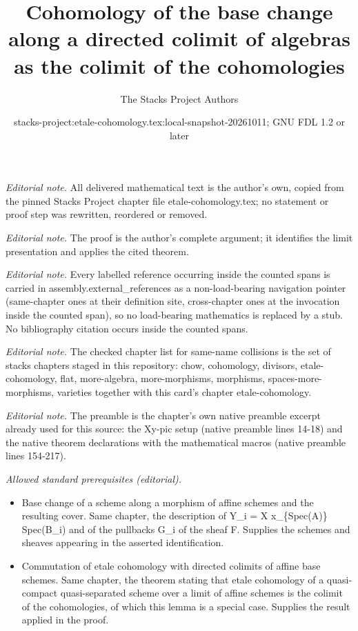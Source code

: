\documentclass[10pt,a4paper]{amsart}
\title{Cohomology of the base change along a directed colimit of algebras as the colimit of the cohomologies}
\author{The Stacks Project Authors}
\date{stacks-project:etale-cohomology.tex:local-snapshot-20261011; GNU FDL 1.2 or later}
\theoremstyle{plain}
\theoremstyle{definition}
\theoremstyle{remark}
\numberwithin{equation}{subsection}
\begin{document}
\maketitle
\noindent\textit{Editorial note.} All delivered mathematical text is the author's own, copied from the pinned Stacks Project chapter file etale-cohomology.tex; no statement or proof step was rewritten, reordered or removed.\par\medskip
\noindent\textit{Editorial note.} The proof is the author's complete argument; it identifies the limit presentation and applies the cited theorem.\par\medskip
\noindent\textit{Editorial note.} Every labelled reference occurring inside the counted spans is carried in assembly.external\_references as a non-load-bearing navigation pointer (same-chapter ones at their definition site, cross-chapter ones at the invocation inside the counted span), so no load-bearing mathematics is replaced by a stub. No bibliography citation occurs inside the counted spans.\par\medskip
\noindent\textit{Editorial note.} The checked chapter list for same-name collisions is the set of stacks chapters staged in this repository: chow, cohomology, divisors, etale-cohomology, flat, more-algebra, more-morphisms, morphisms, spaces-more-morphisms, varieties together with this card's chapter etale-cohomology.\par\medskip
\noindent\textit{Editorial note.} The preamble is the chapter's own native preamble excerpt already used for this source: the Xy-pic setup (native preamble lines 14-18) and the native theorem declarations with the mathematical macros (native preamble lines 154-217).\par\medskip
\noindent\textit{Allowed standard prerequisites (editorial).}\begin{itemize}
\item Base change of a scheme along a morphism of affine schemes and the resulting cover. Same chapter, the description of Y\_i = X x\_\{Spec(A)\} Spec(B\_i) and of the pullbacks G\_i of the sheaf F. Supplies the schemes and sheaves appearing in the asserted identification.
\item Commutation of etale cohomology with directed colimits of affine base schemes. Same chapter, the theorem stating that etale cohomology of a quasi-compact quasi-separated scheme over a limit of affine schemes is the colimit of the cohomologies, of which this lemma is a special case. Supplies the result applied in the proof.
\end{itemize}\medskip
\end{document}
